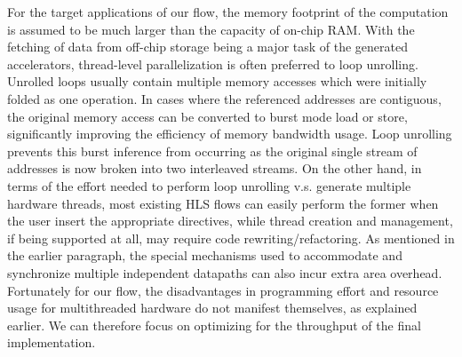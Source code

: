For the target applications of our flow, the memory footprint of the computation is assumed to be
much larger than the capacity of on-chip RAM. With the fetching of data
from off-chip storage being a major task of the generated accelerators,
thread-level parallelization is often preferred to loop unrolling.
Unrolled 
loops usually contain multiple memory accesses which were
initially folded as one operation. In cases where the referenced addresses are contiguous, the original memory access can be converted to burst mode load or store, significantly improving the efficiency of memory bandwidth usage. Loop unrolling prevents this burst
inference from occurring as the original single stream of addresses is now broken
into two interleaved streams. 
On the other hand, in terms of the effort needed to perform loop unrolling v.s. generate multiple hardware threads, most existing HLS flows can easily perform the former when the user insert the appropriate directives, while thread creation and management, if being supported at all, may require code rewriting/refactoring. As mentioned in the earlier paragraph, the special mechanisms used to accommodate and synchronize multiple independent datapaths can also incur extra area overhead. Fortunately for our flow, the disadvantages in programming effort and resource usage for multithreaded hardware do not manifest themselves, as explained earlier. We can therefore focus on optimizing for the throughput of the final implementation. 



















